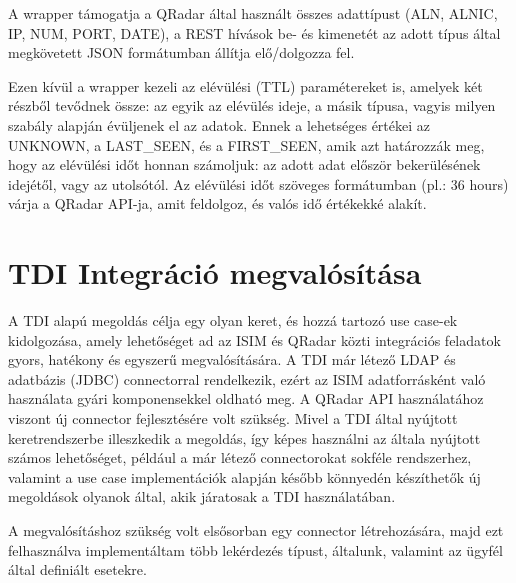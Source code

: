 A wrapper támogatja a QRadar által használt összes adattípust (ALN, ALNIC, IP, NUM, PORT, DATE), a REST hívások be- és kimenetét az adott típus által megkövetett JSON formátumban állítja elő/dolgozza fel.


Ezen kívül a wrapper kezeli az elévülési (TTL) paramétereket is, amelyek két részből tevődnek össze: az egyik az elévülés ideje, a másik típusa, vagyis milyen szabály alapján évüljenek el az adatok. Ennek a lehetséges értékei az UNKNOWN, a LAST\_SEEN, és a FIRST\_SEEN, amik azt határozzák meg, hogy az elévülési időt honnan számoljuk: az adott adat először bekerülésének idejétől, vagy az utolsótól. Az elévülési időt szöveges formátumban (pl.: 36 hours) várja a QRadar API-ja, amit feldolgoz, és valós idő értékekké alakít.


\section{TDI Integráció megvalósítása}

A TDI alapú megoldás célja egy olyan keret, és hozzá tartozó use case-ek kidolgozása, amely lehetőséget ad az ISIM és QRadar közti integrációs feladatok gyors, hatékony és egyszerű megvalósítására. 
A TDI már létező LDAP és adatbázis (JDBC) connectorral rendelkezik, ezért az ISIM adatforrásként való használata gyári komponensekkel oldható meg. A QRadar API használatához viszont új connector fejlesztésére volt szükség.
Mivel a TDI által nyújtott keretrendszerbe illeszkedik a megoldás, így képes használni az általa nyújtott számos lehetőséget, például a már létező connectorokat sokféle rendszerhez, valamint a use case implementációk alapján később könnyedén készíthetők új megoldások olyanok által, akik járatosak a TDI használatában. 

A megvalósításhoz szükség volt elsősorban egy connector létrehozására, majd ezt felhasználva implementáltam több lekérdezés típust, általunk, valamint az ügyfél által definiált esetekre.

